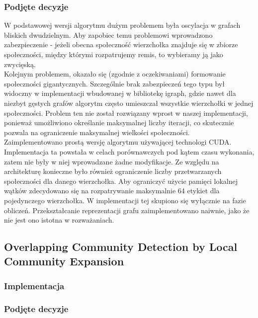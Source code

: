 \documentclass{article}
\begin{document}
\subsubsection{Podjęte decyzje}

W podstawowej wersji algorytmu dużym problemem była oscylacja w grafach bliskich dwudzielnym. Aby zapobiec temu problemowi wprowadzono zabezpieczenie - jeżeli obecna społeczność wierzchołka znajduje się w zbiorze społeczności, między którymi rozpatrujemy remis, to wybieramy ją jako zwycięską.\\

Kolejnym problemem, okazało się (zgodnie z oczekiwaniami) formowanie społeczności gigantycznych. Szczególnie brak zabezpieczeń tego typu był widoczny w implementacji wbudowanej w bibliotekę igraph, gdzie nawet dla niezbyt gęstych grafów algorytm często umieszczał wszystkie wierzchołki w jednej społeczności. Problem ten nie został rozwiązany wprost w naszej implementacji, ponieważ umożliwiono określanie maksymalnej liczby iteracji, co skutecznie pozwala na ograniczenie maksymalnej wielkości społeczności.\\

Zaimplementowano prostą wersję algorytmu używającej technologi CUDA. Implementacja ta powstała w celach porównawczych pod kątem czasu wykonania, zatem nie były w niej wprowadzane żadne modyfikacje. Ze względu na architekturę konieczne było również ograniczenie liczby przetwarzanych społeczności dla danego wierzchołka. Aby ograniczyć użycie pamięci lokalnej wątków zdecydowano się na rozpatrywanie maksymalnie 64 etykiet dla pojedynczego wierzchołka. W implementacji tej skupiono się wyłącznie na fazie obliczeń. Przekształcanie reprezentacji grafu zaimplementowano naiwnie, jako że nie jest ono istotna w rozważaniach.

\subsection{Overlapping Community Detection by Local Community Expansion}
\subsubsection{Implementacja}
\subsubsection{Podjęte decyzje}
\end{document}
